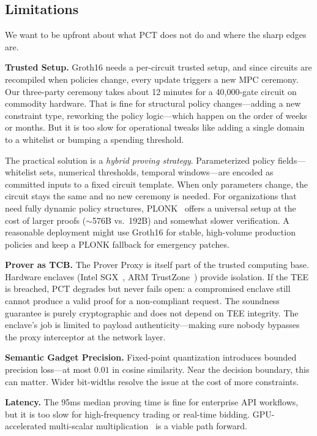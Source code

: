 \documentclass[10pt,conference]{IEEEtran}
\begin{document}
\subsection{Limitations}

We want to be upfront about what PCT does not do and where the sharp edges are.

\textbf{Trusted Setup.} Groth16 needs a per-circuit trusted setup, and since circuits are recompiled when policies change, every update triggers a new MPC ceremony. Our three-party ceremony takes about 12 minutes for a 40,000-gate circuit on commodity hardware. That is fine for structural policy changes---adding a new constraint type, reworking the policy logic---which happen on the order of weeks or months. But it is too slow for operational tweaks like adding a single domain to a whitelist or bumping a spending threshold.

The practical solution is a \emph{hybrid proving strategy}. Parameterized policy fields---whitelist sets, numerical thresholds, temporal windows---are encoded as committed inputs to a fixed circuit template. When only parameters change, the circuit stays the same and no new ceremony is needed. For organizations that need fully dynamic policy structures, PLONK~\cite{gabizon2019plonk} offers a universal setup at the cost of larger proofs ($\sim$576B vs.\ 192B) and somewhat slower verification. A reasonable deployment might use Groth16 for stable, high-volume production policies and keep a PLONK fallback for emergency patches.

\textbf{Prover as TCB.} The Prover Proxy is itself part of the trusted computing base. Hardware enclaves (Intel SGX~\cite{costan2016intel}, ARM TrustZone~\cite{pinto2019demystifying}) provide isolation. If the TEE is breached, PCT degrades but never fails open: a compromised enclave still cannot produce a valid proof for a non-compliant request. The soundness guarantee is purely cryptographic and does not depend on TEE integrity. The enclave's job is limited to payload authenticity---making sure nobody bypasses the proxy interceptor at the network layer.

\textbf{Semantic Gadget Precision.} Fixed-point quantization introduces bounded precision loss---at most $0.01$ in cosine similarity. Near the decision boundary, this can matter. Wider bit-widths resolve the issue at the cost of more constraints.

\textbf{Latency.} The 95ms median proving time is fine for enterprise API workflows, but it is too slow for high-frequency trading or real-time bidding. GPU-accelerated multi-scalar multiplication~\cite{lu2024pipemsm} is a viable path forward.
\end{document}
